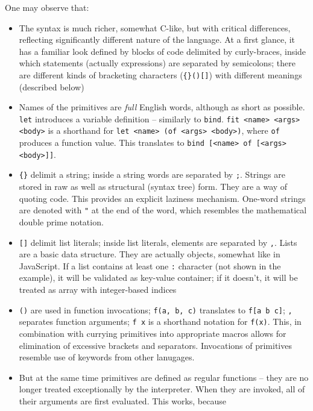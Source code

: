 One may observe that:
\begin{itemize}
    \item The syntax is much richer, somewhat C-like, but with critical
      differences, reflecting significantly different nature of the language. At
      a first glance, it has a familiar look defined by blocks of code delimited
      by curly-braces, inside which statements (actually expressions) are
      separated by semicolons; there are different kinds of bracketing
      characters (\texttt{\{\}()[]}) with different meanings (described below)
    \item Names of the primitives are \textit{full} English words, although as
      short as possible. \texttt{let} introduces a variable definition --
      similarly to \texttt{bind}. \texttt{fit <name> <args> <body>} is a
      shorthand for \texttt{let <name> (of <args> <body>)}, where \texttt{of}
      produces a function value. This translates to \texttt{bind [<name> of
          [<args> <body>]]}.
    \item \texttt{\{\}} delimit a string; inside a string words are separated by
      \texttt{;}. Strings are stored in raw as well as structural (syntax tree)
      form. They are a way of quoting code. This provides an explicit laziness
      mechanism. One-word strings are denoted with \texttt{"} at the end of the
      word, which resembles the mathematical double prime notation.
    \item \texttt{[]} delimit list literals; inside list literals, elements are
      separated by \texttt{,}. Lists are a basic data structure. They are
      actually objects, somewhat like in JavaScript. If a list contains at least
      one \texttt{:} character (not shown in the example), it will be validated
      as key-value container; if it doesn't, it will be treated as array with
      integer-based indices
    \item \texttt{()} are used in function invocations; \texttt{f(a, b, c)}
      translates to \texttt{f[a b c]}; \texttt{,} separates function arguments;
      \texttt{f x} is a shorthand notation for \texttt{f(x)}. This, in
      combination with currying primitives into appropriate macros allows for
      elimination of excessive brackets and separators. Invocations of
      primitives resemble use of keywords from other lanugages.
    \item But at the same time primitives are defined as regular functions --
      they are no longer treated exceptionally by the interpreter. When they are
      invoked, all of their arguments are first evaluated. This works, because

\end{itemize}

